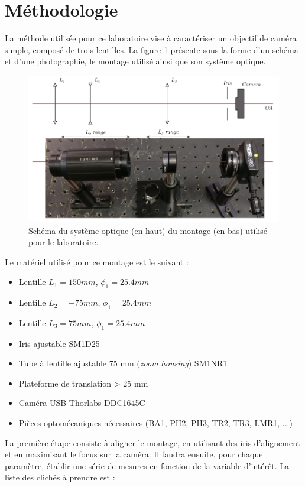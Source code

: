 \documentclass[11pt,letterpaper]{article}
\begin{document}
\section{Méthodologie}

La méthode utilisée pour ce laboratoire vise à caractériser un objectif de caméra simple, composé de trois lentilles. La figure \ref{montage} présente sous la forme d'un schéma et d'une photographie, le montage utilisé ainsi que son système optique. 

\begin{figure}[H]
  \centering
  \includegraphics[scale=0.45]{Montage laboratoire 2.png}
  \caption{Schéma du système optique (en haut) du montage (en bas) utilisé pour le laboratoire.}
  \label{montage}
\end{figure}

Le matériel utilisé pour ce montage est le suivant : 

\begin{itemize}
    \item Lentille $L_1 = 150 mm$, $\phi_1 = 25.4 mm$
    \item Lentille $L_2 = -75 mm$, $\phi_1 = 25.4 mm$
    \item Lentille $L_3 = 75 mm$, $\phi_1 = 25.4 mm$
    \item Iris ajustable SM1D25
    \item Tube à lentille ajustable 75 mm (\textit{zoom housing}) SM1NR1
    \item Plateforme de translation > 25 mm
    \item Caméra USB Thorlabs DDC1645C
    \item Pièces optomécaniques nécessaires (BA1, PH2, PH3, TR2, TR3, LMR1, ...)
\end{itemize}

La première étape consiste à aligner le montage, en utilisant des iris d'alignement et en maximisant le focus sur la caméra. Il faudra ensuite, pour chaque paramètre, établir une série de mesures en fonction de la variable d'intérêt. La liste des clichés à prendre est : 
\end{document}
